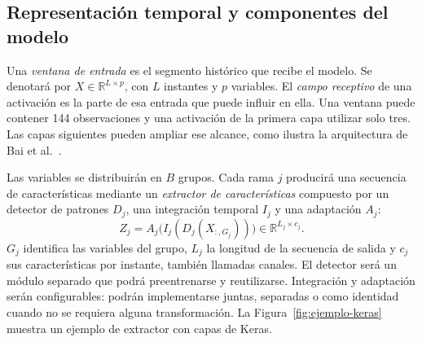 \documentclass[11pt,letterpaper]{article}
\begin{document}
\subsection{Representación temporal y componentes del modelo}

Una \emph{ventana de entrada} es el segmento histórico que recibe el modelo. Se denotará por $X\in\mathbb{R}^{L\times p}$, con $L$ instantes y $p$ variables. El \emph{campo receptivo} de una activación es la parte de esa entrada que puede influir en ella. Una ventana puede contener 144 observaciones y una activación de la primera capa utilizar solo tres. Las capas siguientes pueden ampliar ese alcance, como ilustra la arquitectura de Bai et al.~\cite{bai2018tcn}.

Las variables se distribuirán en $B$ grupos. Cada rama $j$ producirá una secuencia de características mediante un \emph{extractor de características} compuesto por un detector de patrones $D_j$, una integración temporal $I_j$ y una adaptación $A_j$:
\begin{equation}
Z_j=A_j\bigl(I_j(D_j(X_{:,G_j}))\bigr)\in\mathbb{R}^{L_j\times c_j}.
\end{equation}
$G_j$ identifica las variables del grupo, $L_j$ la longitud de la secuencia de salida y $c_j$ sus características por instante, también llamadas canales. El detector será un módulo separado que podrá preentrenarse y reutilizarse. Integración y adaptación serán configurables: podrán implementarse juntas, separadas o como identidad cuando no se requiera alguna transformación. La Figura~\ref{fig:ejemplo-keras} muestra un ejemplo de extractor con capas de Keras.
\end{document}
